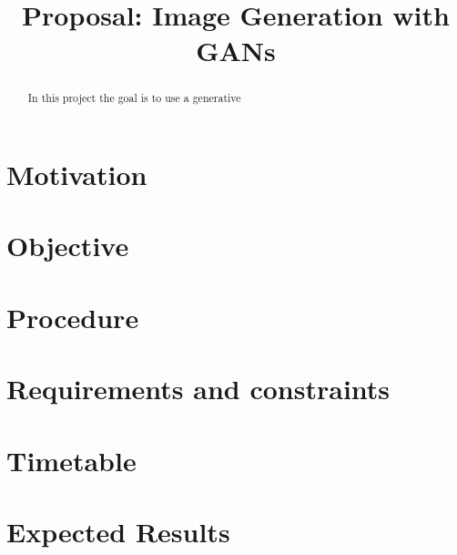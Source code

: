 \documentclass[conference,onecolumn,compsoc]{IEEEtran}
\begin{document}
\title{Proposal: Image Generation with GANs}

\author{
}
\maketitle

\begin{abstract}

\noindent
In this project the goal is to use a generative 

\end{abstract}


\section{Motivation}

\noindent
\blindtext


\section{Objective}

\noindent
\blindtext


\section{Procedure}

\noindent
\blindtext

\section{Requirements and constraints}

\blindtext

\section{Timetable}

\noindent
\blindtext \cite{yazıcı2019unusual}

\section{Expected Results}
\end{document}
